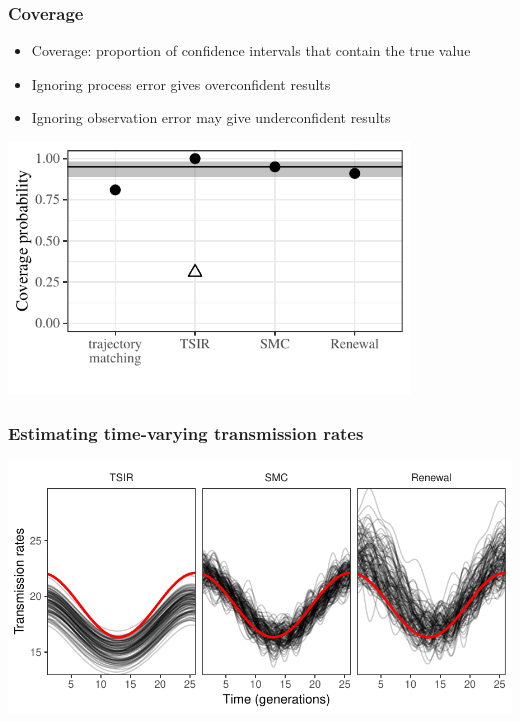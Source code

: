 \documentclass{beamer}
\begin{document}
\begin{frame}
\frametitle{Coverage}
\begin{itemize}
	\item Coverage: proportion of confidence intervals that contain the true value
	\item Ignoring process error gives overconfident results \citep{king2015avoidable, taylor2016stochasticity}
	\item Ignoring observation error may give underconfident results
\end{itemize}
\begin{center}
\includegraphics[width=0.8\textwidth]{coverage.pdf}
\end{center}
\end{frame}

\begin{frame}
\frametitle{Estimating time-varying transmission rates}
\begin{center}
\includegraphics[width=\textwidth]{transmission.pdf}
\end{center}
\end{frame}
\end{document}
